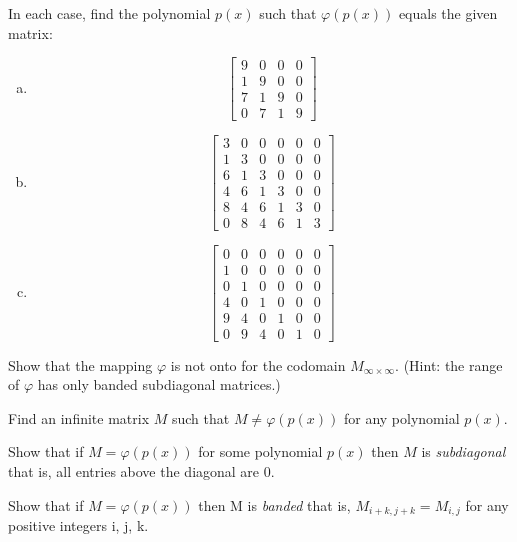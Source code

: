 \begin{exercise}{}
In each case, find the polynomial $p(x)$ such that $\varphi(p(x))$ equals the given matrix:
\begin{enumerate}[(a)]
	\item 
\[\left[\begin{array}{cccc}9 & 0 & 0 & 0\\1 & 9 & 0 & 0\\7 & 1 & 9 & 0\\0 & 7 & 1 & 9\end{array}\right]\]	
\item
\[\left[\begin{array}{cccccc}3 & 0 & 0 & 0 & 0 & 0\\1 & 3 & 0 & 0 & 0 & 0\\6 & 1 & 3 & 0 & 0 & 0\\4 & 6 & 1 & 3 & 0 & 0\\8 & 4 & 6 & 1 & 3 & 0\\0 & 8 & 4 & 6 & 1 & 3\end{array}\right]\]
\item
\[\left[\begin{array}{cccccc}0 & 0 & 0 & 0 & 0 & 0\\1 & 0 & 0 & 0 & 0 & 0\\0 & 1 & 0 & 0 & 0 & 0\\4 & 0 & 1 & 0 & 0 & 0\\9 & 4 & 0 & 1 & 0 & 0\\0 & 9 & 4 & 0 & 1 & 0\end{array}\right]\]
\end{enumerate}
\end{exercise}

\begin{exercise}{}
Show that the mapping $\varphi$ is not onto for the codomain $M_{\infty \times \infty}$. (Hint: the range of $\varphi$ has only banded subdiagonal matrices.)
\end{exercise}

\begin{exercise}{}
Find an infinite matrix $M$ such that $M \neq \varphi(p(x))$ for any polynomial $p(x)$.
\end{exercise}

\begin{exercise}{}
Show that if $M = \varphi(p(x))$ for some polynomial $p(x)$ then $M$ is \emph{subdiagonal} that is, all entries above the diagonal are 0.
\end{exercise}

\begin{exercise}{}
Show that if $M = \varphi(p(x))$ then M is \emph{banded} that is, $M_{i+k, j+k} = M_{i, j}$ for any positive integers i, j, k.
\end{exercise}

